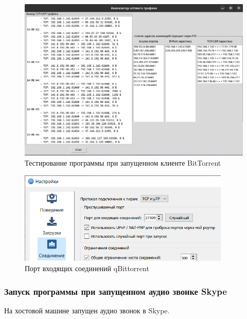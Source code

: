 \documentclass[bachelor, och, coursework]{SCWorks}
\begin{document}
\begin{figure}[H]
    \centering
    \includegraphics[width=0.999\textwidth]{test3.png}
    \caption{Тестирование программы при запущенном клиенте BitTorrent}
    \label{test3}
\end{figure}

\begin{figure}[H]
    \centering
    \includegraphics[width=0.899\textwidth]{btport.png}
    \caption{Порт входящих соединений qBittorrent}
    \label{btport}
\end{figure}

\newpage
\subsubsection{Запуск программы при запущенном аудио звонке Skype}
На хостовой машине запущен аудио звонок в Skype.
\end{document}
